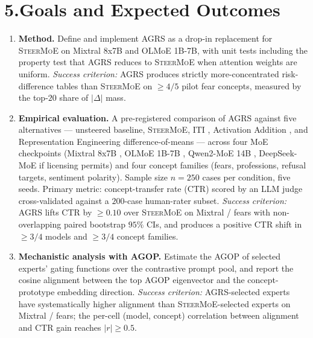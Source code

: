\documentclass[11pt]{article}
\begin{document}
\section*{5.\quad Goals and Expected Outcomes}

\begin{enumerate}
  \item \textbf{Method.} Define and implement AGRS as a drop-in
  replacement for \textsc{SteerMoE} on Mixtral 8x7B and OLMoE 1B-7B,
  with unit tests including the property test that AGRS reduces to
  \textsc{SteerMoE} when attention weights are uniform.
  \emph{Success criterion:} AGRS produces strictly more-concentrated
  risk-difference tables than \textsc{SteerMoE} on $\geq 4/5$ pilot
  fear concepts, measured by the top-$20$ share of $|\Delta|$ mass.

  \item \textbf{Empirical evaluation.} A pre-registered comparison of
  AGRS against five alternatives --- unsteered baseline,
  \textsc{SteerMoE}, \textsc{ITI} \citep{li2023iti}, Activation
  Addition \citep{turner2023activation}, and Representation
  Engineering difference-of-means \citep{zou2023repe} --- across four
  MoE checkpoints (Mixtral 8x7B \citep{jiang2024mixtral}, OLMoE
  1B-7B \citep{muennighoff2024olmoe}, Qwen2-MoE 14B
  \citep{yang2024qwen2moe}, DeepSeek-MoE \citep{dai2024deepseekmoe}
  if licensing permits) and four concept families (fears, professions,
  refusal targets, sentiment polarity). Sample size $n = 250$ cases
  per condition, five seeds. Primary metric: concept-transfer rate
  (CTR) scored by an LLM judge cross-validated against a
  $200$-case human-rater subset.
  \emph{Success criterion:} AGRS lifts CTR by $\geq 0.10$ over
  \textsc{SteerMoE} on Mixtral / fears with non-overlapping paired
  bootstrap $95\%$ CIs, and produces a positive CTR shift in
  $\geq 3/4$ models and $\geq 3/4$ concept families.

  \item \textbf{Mechanistic analysis with AGOP.} Estimate the AGOP
  of selected experts' gating functions over the contrastive prompt
  pool, and report the cosine alignment between the top AGOP
  eigenvector and the concept-prototype embedding direction.
  \emph{Success criterion:} AGRS-selected experts have systematically
  higher alignment than \textsc{SteerMoE}-selected experts on
  Mixtral / fears; the per-cell (model, concept) correlation between
  alignment and CTR gain reaches $|r| \geq 0.5$.
\end{enumerate}
\end{document}
